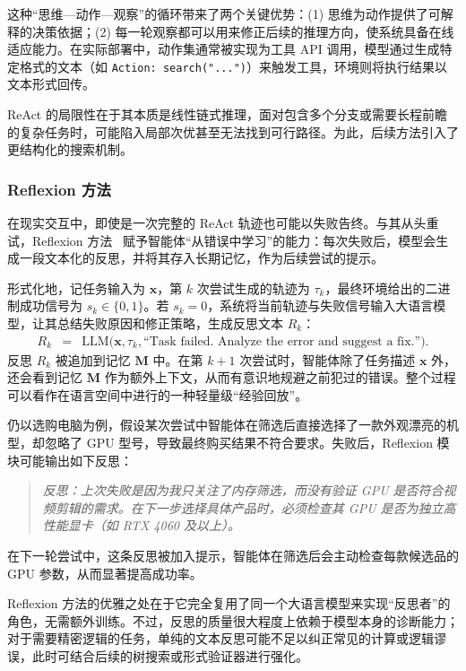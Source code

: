 这种“思维—动作—观察”的循环带来了两个关键优势：(1) 思维为动作提供了可解释的决策依据；(2) 每一轮观察都可以用来修正后续的推理方向，使系统具备在线适应能力。在实际部署中，动作集通常被实现为工具 API 调用，模型通过生成特定格式的文本（如 \texttt{Action: search("...")}）来触发工具，环境则将执行结果以文本形式回传。

ReAct 的局限性在于其本质是线性链式推理，面对包含多个分支或需要长程前瞻的复杂任务时，可能陷入局部次优甚至无法找到可行路径。为此，后续方法引入了更结构化的搜索机制。

\subsubsection{Reflexion 方法}

在现实交互中，即使是一次完整的 ReAct 轨迹也可能以失败告终。与其从头重试，Reflexion 方法~\cite{shinn-etal:2023reflexion} 赋予智能体“从错误中学习”的能力：每次失败后，模型会生成一段文本化的反思，并将其存入长期记忆，作为后续尝试的提示。

形式化地，记任务输入为 $\mathbf{x}$，第 $k$ 次尝试生成的轨迹为 $\tau_k$，最终环境给出的二进制成功信号为 $s_k \in \{0,1\}$。若 $s_k = 0$，系统将当前轨迹与失败信号输入大语言模型，让其总结失败原因和修正策略，生成反思文本 $R_k$：
\begin{eqnarray}
R_k &=& \text{LLM}\bigl(\mathbf{x}, \tau_k, \text{``Task failed. Analyze the error and suggest a fix.''}\bigr).
\end{eqnarray}
反思 $R_k$ 被追加到记忆 $\mathbf{M}$ 中。在第 $k+1$ 次尝试时，智能体除了任务描述 $\mathbf{x}$ 外，还会看到记忆 $\mathbf{M}$ 作为额外上下文，从而有意识地规避之前犯过的错误。整个过程可以看作在语言空间中进行的一种轻量级“经验回放”。

仍以选购电脑为例，假设某次尝试中智能体在筛选后直接选择了一款外观漂亮的机型，却忽略了 GPU 型号，导致最终购买结果不符合要求。失败后，Reflexion 模块可能输出如下反思：

\vspace{0.5em}
\begin{quote}
\textit{反思：上次失败是因为我只关注了内存筛选，而没有验证 GPU 是否符合视频剪辑的需求。在下一步选择具体产品时，必须检查其 GPU 是否为独立高性能显卡（如 RTX 4060 及以上）。}
\end{quote}
\vspace{0.5em}

在下一轮尝试中，这条反思被加入提示，智能体在筛选后会主动检查每款候选品的 GPU 参数，从而显著提高成功率。

Reflexion 方法的优雅之处在于它完全复用了同一个大语言模型来实现“反思者”的角色，无需额外训练。不过，反思的质量很大程度上依赖于模型本身的诊断能力；对于需要精密逻辑的任务，单纯的文本反思可能不足以纠正常见的计算或逻辑谬误，此时可结合后续的树搜索或形式验证器进行强化。


